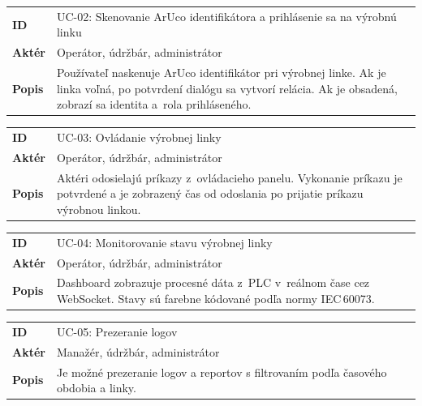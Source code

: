 \vspace{6pt}\noindent
\begin{tabularx}{\textwidth}{@{}l X@{}}
      \toprule
      \textbf{ID}    & UC-02: Skenovanie ArUco identifikátora a prihlásenie sa na výrobnú linku              \\
      \textbf{Aktér} & Operátor, údržbár, administrátor                                                    \\
      \textbf{Popis} & Používateľ naskenuje ArUco identifikátor pri výrobnej linke.
      Ak je linka voľná, po potvrdení dialógu sa vytvorí relácia.
      Ak je obsadená, zobrazí sa identita a~rola prihláseného.\\
      \bottomrule
\end{tabularx}

\vspace{6pt}\noindent
\begin{tabularx}{\textwidth}{@{}l X@{}}
      \toprule
      \textbf{ID}    & UC-03: Ovládanie výrobnej linky                                                   \\
      \textbf{Aktér} & Operátor, údržbár, administrátor                                                      \\
      \textbf{Popis} & Aktéri odosielajú príkazy z~ovládacieho panelu.
      Vykonanie príkazu je potvrdené a je zobrazený čas od odoslania po prijatie príkazu výrobnou linkou. \\
      \bottomrule
\end{tabularx}

\vspace{6pt}\noindent
\begin{tabularx}{\textwidth}{@{}l X@{}}
      \toprule
      \textbf{ID}    & UC-04: Monitorovanie stavu výrobnej linky                                                                                   \\
      \textbf{Aktér} & Operátor, údržbár, administrátor                                                                                                \\
      \textbf{Popis} & Dashboard zobrazuje procesné dáta z~PLC v~reálnom čase cez WebSocket. Stavy sú farebne kódované podľa normy IEC\,60073. \\
      \bottomrule
\end{tabularx}

\vspace{6pt}\noindent
\begin{tabularx}{\textwidth}{@{}l X@{}}
      \toprule
      \textbf{ID}    & UC-05: Prezeranie logov                                                                 \\
      \textbf{Aktér} & Manažér, údržbár, administrátor                                                                 \\
      \textbf{Popis} & Je možné prezeranie logov a reportov s filtrovaním podľa časového obdobia a linky. \\
      \bottomrule
\end{tabularx}


